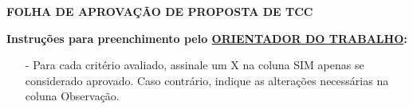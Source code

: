 \documentclass{ufsc-thesis} %
\begin{document}
\pretextual%
\imprimircapa

\imprimirfolhaderosto

\afterpage{\null\newpage}

\clearpage
\newpage


\begin{snugshade}
    \begin{center}
        {\textbf{\small{FOLHA DE APROVAÇÃO DE PROPOSTA DE TCC}}}
    \end{center}
\end{snugshade}

\vspace{-8pt}
\noindent{}

\vspace{8pt}

{%
    \small
    \noindent\textbf{Instruções para preenchimento pelo \uline{ORIENTADOR DO TRABALHO}:}
    \begin{itemize}[leftmargin=*,noitemsep,topsep=0pt]
        \item[-] Para cada critério avaliado, assinale um X na coluna SIM apenas se considerado aprovado. Caso contrário, indique as alterações necessárias na coluna Observação.
    \end{itemize}
}

\vspace{8pt}
\end{document}

